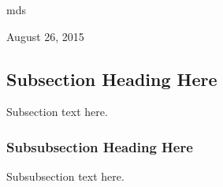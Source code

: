 \documentclass[journal,onecolumn]{IEEEtran}
\begin{document}
\hfill mds
 
\hfill August 26, 2015

\subsection{Subsection Heading Here}
Subsection text here.


\subsubsection{Subsubsection Heading Here}
Subsubsection text here.


%
%



%
%
\end{document}
